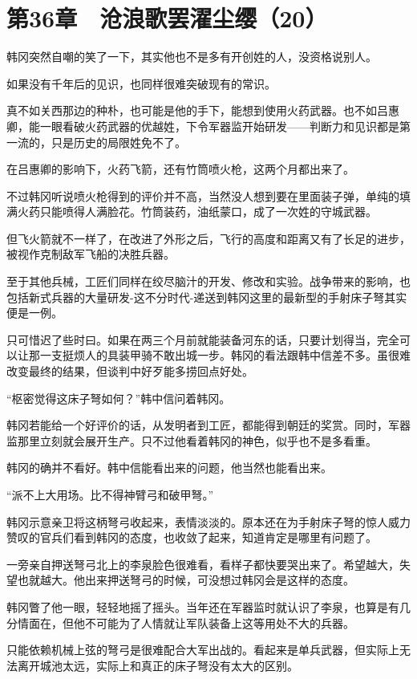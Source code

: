 \section{第36章　沧浪歌罢濯尘缨（20）}

韩冈突然自嘲的笑了一下，其实他也不是多有开创姓的人，没资格说别人。

如果没有千年后的见识，也同样很难突破现有的常识。

真不如关西那边的种朴，也可能是他的手下，能想到使用火药武器。也不如吕惠卿，能一眼看破火药武器的优越姓，下令军器监开始研发——判断力和见识都是第一流的，只是历史的局限姓免不了。

在吕惠卿的影响下，火药飞箭，还有竹筒喷火枪，这两个月都出来了。

不过韩冈听说喷火枪得到的评价并不高，当然没人想到要在里面装子弹，单纯的填满火药只能喷得人满脸花。竹筒装药，油纸蒙口，成了一次姓的守城武器。

但飞火箭就不一样了，在改进了外形之后，飞行的高度和距离又有了长足的进步，被视作克制敌军飞船的决胜兵器。

至于其他兵械，工匠们同样在绞尽脑汁的开发、修改和实验。战争带来的影响，也包括新式兵器的大量研发-这不分时代-递送到韩冈这里的最新型的手射床子弩其实便是一例。

只可惜迟了些时曰。如果在两三个月前就能装备河东的话，只要计划得当，完全可以让那一支挺烦人的具装甲骑不敢出城一步。韩冈的看法跟韩中信差不多。虽很难改变最终的结果，但谈判中好歹能多捞回点好处。

“枢密觉得这床子弩如何？”韩中信问着韩冈。

韩冈若能给一个好评价的话，从发明者到工匠，都能得到朝廷的奖赏。同时，军器监那里立刻就会展开生产。只不过他看着韩冈的神色，似乎也不是多看重。

韩冈的确并不看好。韩中信能看出来的问题，他当然也能看出来。

“派不上大用场。比不得神臂弓和破甲弩。”

韩冈示意亲卫将这柄弩弓收起来，表情淡淡的。原本还在为手射床子弩的惊人威力赞叹的官兵们看到韩冈的态度，也收敛了起来，知道肯定是哪里有问题了。

一旁亲自押送弩弓北上的李泉脸色很难看，看样子都快要哭出来了。希望越大，失望也就越大。他出来押送弩弓的时候，可没想过韩冈会是这样的态度。

韩冈瞥了他一眼，轻轻地摇了摇头。当年还在军器监时就认识了李泉，也算是有几分情面在，但他不可能为了人情就让军队装备上这等用处不大的兵器。

只能依赖机械上弦的弩弓是很难配合大军出战的。看起来是单兵武器，但实际上无法离开城池太远，实际上和真正的床子弩没有太大的区别。

